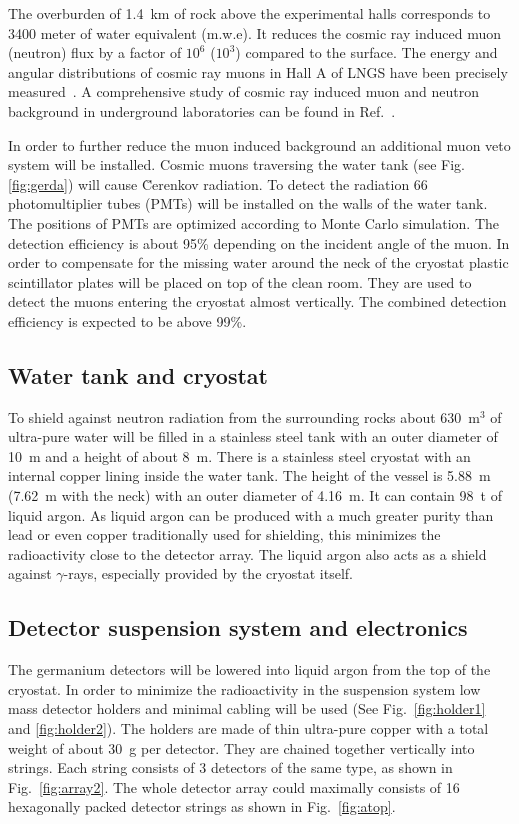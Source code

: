 The overburden of 1.4~km of rock above the experimental halls corresponds to 3400 meter of water equivalent (m.w.e). It reduces the cosmic ray induced muon (neutron) flux by a factor of $10^{6}$ ($10^{3}$) compared to the surface. The energy and angular distributions of cosmic ray muons in Hall A of LNGS have been precisely measured~\cite{Amb95, Lip91, Amb03}. A comprehensive study of cosmic ray induced muon and neutron background in underground laboratories can be found in Ref.~\cite{Mei06}.

In order to further reduce the muon induced background an additional muon veto system will be installed. Cosmic muons traversing the water tank (see Fig.\ref{fig:gerda}) will cause \u{C}erenkov radiation. To detect the radiation 66 photomultiplier tubes (PMTs) will be installed on the walls of the water tank. The positions of PMTs are optimized according to Monte Carlo simulation. The detection efficiency is about 95\% depending on the incident angle of the muon. In order to compensate for the missing water around the neck of the cryostat plastic scintillator plates will be placed on top of the clean room. They are used to detect the muons entering the cryostat almost vertically. The combined detection efficiency is expected to be above 99\%.

\subsection{Water tank and cryostat}
\label{sec:gerda:rock}
To shield against neutron radiation from the surrounding rocks about 630~m$^{3}$ of ultra-pure water will be filled in a stainless steel tank with an outer diameter of 10~m and a height of about 8~m. There is a stainless steel cryostat with an internal copper lining inside the water tank. The height of the vessel is 5.88~m (7.62~m with the neck) with an outer diameter of 4.16~m. It can contain 98~t of liquid argon. As liquid argon can be produced with a much greater purity than lead or even copper traditionally used for shielding, this minimizes the radioactivity close to the detector array. The liquid argon also acts as a shield against $\gamma$-rays, especially provided by the cryostat itself.

\subsection{Detector suspension system and electronics}
\label{sec:gerda:cable}
The germanium detectors will be lowered into liquid argon from the top of the cryostat. In order to minimize the radioactivity in the suspension system low mass detector holders and minimal cabling will be used (See Fig.~\ref{fig:holder1} and \ref{fig:holder2}). The holders are made of thin ultra-pure copper with a total weight of about 30~g per detector. They are chained together vertically into strings. Each string consists of 3 detectors of the same type, as shown in Fig.~\ref{fig:array2}. The whole detector array could maximally consists of 16 hexagonally packed detector strings as shown in Fig.~\ref{fig:atop}. 

